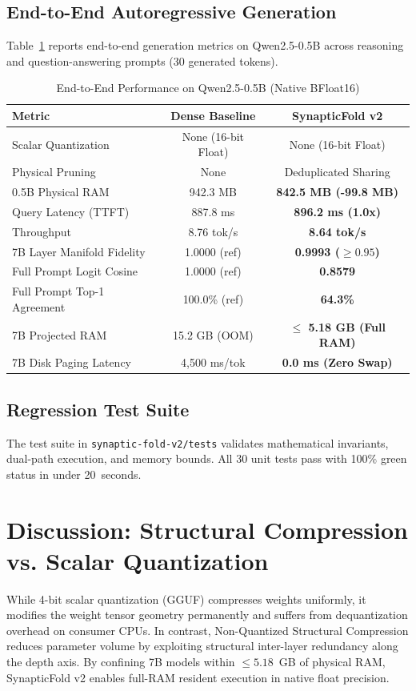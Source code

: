 \documentclass[10pt,journal,compsoc]{IEEEtran}
\theoremstyle{definition}
\begin{document}
\subsection{End-to-End Autoregressive Generation}
Table~\ref{tab:generation} reports end-to-end generation metrics on Qwen2.5-0.5B across reasoning and question-answering prompts (30 generated tokens).

\begin{table}[h]
\caption{End-to-End Performance on Qwen2.5-0.5B (Native BFloat16)}
\label{tab:generation}
\centering
\begin{tabular}{lcc}
\toprule
\textbf{Metric} & \textbf{Dense Baseline} & \textbf{SynapticFold v2} \\
\midrule
Scalar Quantization & None (16-bit Float) & None (16-bit Float) \\
Physical Pruning & None & Deduplicated Sharing \\
0.5B Physical RAM & 942.3 MB & \textbf{842.5 MB (-99.8 MB)} \\
Query Latency (TTFT) & 887.8 ms & \textbf{896.2 ms (1.0x)} \\
Throughput & 8.76 tok/s & \textbf{8.64 tok/s} \\
7B Layer Manifold Fidelity & 1.0000 (ref) & \textbf{0.9993 ($\ge 0.95$)} \\
Full Prompt Logit Cosine & 1.0000 (ref) & \textbf{0.8579} \\
Full Prompt Top-1 Agreement & 100.0\% (ref) & \textbf{64.3\%} \\
7B Projected RAM & 15.2 GB (OOM) & \textbf{$\le$ 5.18 GB (Full RAM)} \\
7B Disk Paging Latency & 4,500 ms/tok & \textbf{0.0 ms (Zero Swap)} \\
\bottomrule
\end{tabular}
\end{table}

\subsection{Regression Test Suite}
The test suite in \texttt{synaptic-fold-v2/tests} validates mathematical invariants, dual-path execution, and memory bounds. All 30 unit tests pass with 100\% green status in under 20~seconds.

\section{Discussion: Structural Compression vs. Scalar Quantization}
While 4-bit scalar quantization (GGUF) compresses weights uniformly, it modifies the weight tensor geometry permanently and suffers from dequantization overhead on consumer CPUs. In contrast, Non-Quantized Structural Compression reduces parameter volume by exploiting structural inter-layer redundancy along the depth axis. By confining 7B models within $\le 5.18$~GB of physical RAM, SynapticFold v2 enables full-RAM resident execution in native float precision.
\end{document}
